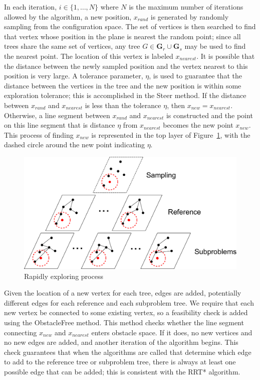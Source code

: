 \documentclass{article}
\begin{document}
In each iteration, $i\in\{1, \ldots, N\}$ where $N$ is the maximum number of iterations allowed by the algorithm, a new position, $x_{rand}$ is generated by randomly sampling from the configuration space.  
The set of vertices is then searched to find that vertex whose position in the plane is nearest the random point; since all trees share the same set of vertices, any tree $G\in{\mathbf G}_r \cup {\mathbf G}_s$ may be used to find the nearest point.  
The location of this vertex is labeled $x_{nearest}$.  
It is possible that the distance between the newly sampled position and the vertex nearest to this position is very large.  
A tolerance parameter, $\eta$, is used to guarantee that the distance between the vertices in the tree and the new position is within some exploration tolerance; this is accomplished in the {\sc Steer} method.  
If the distance between $x_{rand}$ and $x_{nearest}$ is less than the tolerance $\eta$, then $x_{new}=x_{nearest}$.  
Otherwise, a line segment between $x_{rand}$ and $x_{nearest}$ is constructed and the point on this line segment that is distance $\eta$ from $x_{nearest}$ becomes the new point $x_{new}$. 
This process of finding $x_{new}$ is represented in the top layer of Figure~\ref{fig:MORRTstar}, with the dashed circle around the new point indicating $\eta$.

\begin{figure}[H]
\centering
\includegraphics[width=0.9\linewidth]{./fig/MORRTstar}
\caption{Rapidly exploring process}
\label{fig:MORRTstar}
\end{figure}

Given the location of a new vertex for each tree, edges are added, potentially different edges for each reference and each subproblem tree.
We require that each new vertex be connected to some existing vertex, so a feasibility check is added using the {\sc ObstacleFree} method.
This method checks whether the line segment connecting $x_{new}$ and $x_{nearest}$ enters obstacle space.
If it does, no new vertices and no new edges are added, and another iteration of the algorithm begins. 
This check guarantees that when the algorithms are called that determine which edge to add to the reference tree or subproblem tree, there is always at least one possible edge that can be added; this is consistent with the RRT* algorithm.
\end{document}
